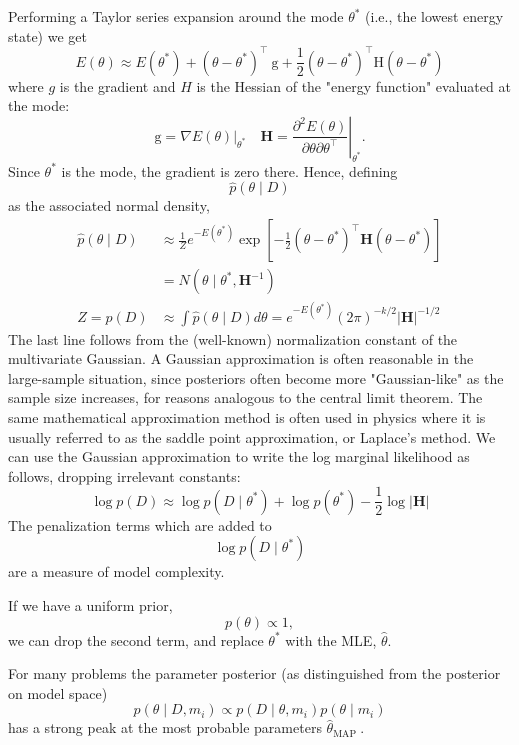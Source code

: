 \documentclass[11pt]{article}
\theoremstyle{plain} %
\theoremstyle{remark}
\begin{document}
Performing a Taylor series expansion around the mode $\theta^{*}$ (i.e.,
  the lowest energy state) we get
$$
E(\theta) \approx E\left(\theta^{*}\right)+\left(\theta-\theta^{*}\right)^\top \mathrm{~g}+\frac{1}{2}\left(\theta-\theta^{*}\right)^\top \mathrm{H}\left(\theta-\theta^{*}\right)
$$
where $g$ is the gradient and $H$ is the Hessian of the "energy function"
evaluated at the mode:
$$
\mathrm{g}=\left.\nabla E(\theta)\right|_{\theta^{*}} \quad \boldsymbol{H}=\left.\frac{\partial^{2} E(\theta)}{\partial \theta \partial \theta^\top}\right|_{\theta^{*}} .
$$
Since $\theta^{*}$ is the mode, the gradient is zero there. Hence, defining
$$
\hat{p}(\theta \mid D)
$$
as the associated normal density,
$$
\begin{aligned}
\hat{p}(\theta \mid D) & \approx \frac{1}{Z} e^{-E\left(\theta^{*}\right)} \exp \left[-\frac{1}{2}\left(\theta-\theta^{*}\right)^\top \boldsymbol{H}\left(\theta-\theta^{*}\right)\right] \\
& =N\left(\theta \mid \theta^{*}, \boldsymbol{H}^{-1}\right) \\
Z=p(D) & \approx \int \hat{p}(\theta \mid D) d \theta=e^{-E\left(\theta^{*}\right)}(2 \pi)^{-k / 2}|\boldsymbol{H}|^{-1 / 2}
\end{aligned}
$$
The last line follows from the (well-known) normalization constant of
  the multivariate Gaussian. A Gaussian approximation is often reasonable in the large-sample
  situation, since posteriors often become more "Gaussian-like" as the sample
  size increases, for reasons analogous to the central limit theorem. The same mathematical approximation method is often used in physics
  where it is usually referred to as the saddle point approximation, or
  Laplace's method. We can use the Gaussian approximation to write the log marginal
  likelihood as follows, dropping irrelevant constants:
$$
\log p(D) \approx \log p\left(D \mid \theta^{*}\right)+\log p\left(\theta^{*}\right)-\frac{1}{2} \log |\boldsymbol{H}|
$$
The penalization terms which are added to 
$$
\log p\left(D \mid \theta^{*}\right)
$$
are a measure of model complexity.

If we have a uniform prior, 
$$
p(\theta) \propto 1,
$$
we can drop the second term, and replace $\theta^{*}$ with the MLE,
$\hat{\theta}$.

For many problems the parameter posterior (as distinguished from the
  posterior on model space)
$$
p\left(\theta \mid D, m_{i}\right) \propto p\left(D \mid \theta, m_{i}\right) p\left(\theta \mid m_{i}\right)
$$
has a strong peak at the most probable parameters $\hat{\theta}_{\text {MAP }}$.
\end{document}
